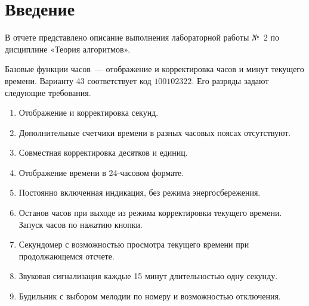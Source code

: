 \section*{Введение}
{}

В отчете представлено описание выполнения лабораторной работы №~2 по дисциплине «Теория алгоритмов».

Базовые функции часов~--- отображение и корректировка часов и минут текущего времени. Варианту 43 соответствует код $100102322$. Его разряды задают следующие требования.

\begin{enumerate}[label=\Alph*),leftmargin=*]
	\item Отображение и корректировка секунд.
	\item Дополнительные счетчики времени в разных часовых поясах отсутствуют.
	\item Совместная корректировка десятков и единиц.
	\item Отображение времени в 24-часовом формате.
	\item Постоянно включенная индикация, без режима энергосбережения.
	\item Останов часов при выходе из режима корректировки текущего времени. Запуск часов по нажатию кнопки.
	\item Секундомер с возможностью просмотра текущего времени при продолжающемся отсчете.
	\item Звуковая сигнализация каждые 15 минут длительностью одну секунду.
	\item Будильник с выбором мелодии по номеру и возможностью отключения.
\end{enumerate}

